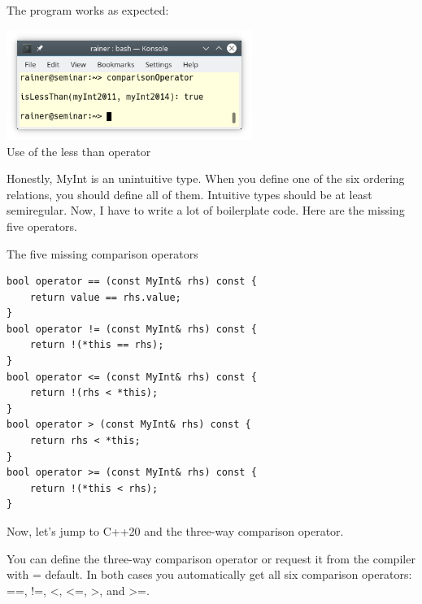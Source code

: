 The program works as expected:

\begin{center}
\includegraphics[width=0.6\textwidth]{content/3/chapter4/images/27.png}\\
Use of the less than operator
\end{center}

Honestly, MyInt is an unintuitive type. When you define one of the six ordering relations, you should define all of them. Intuitive types should be at least semiregular. Now, I have to write a lot of boilerplate code. Here are the missing five operators.

\noindent
The five missing comparison operators
\begin{lstlisting}[style=styleCXX]
bool operator == (const MyInt& rhs) const {
	return value == rhs.value;
}
bool operator != (const MyInt& rhs) const {
	return !(*this == rhs);
}
bool operator <= (const MyInt& rhs) const {
	return !(rhs < *this);
}
bool operator > (const MyInt& rhs) const {
	return rhs < *this;
}
bool operator >= (const MyInt& rhs) const {
	return !(*this < rhs);
}
\end{lstlisting}

Now, let’s jump to C++20 and the three-way comparison operator.


You can define the three-way comparison operator or request it from the compiler with = default. In both cases you automatically get all six comparison operators: ==, !=, <, <=, >, and >=.

